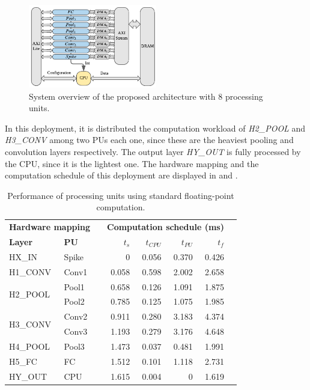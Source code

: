\begin{figure}[h!]
	\centering
	\includegraphics[width=0.5\textwidth]{../figures/sbs_hw_experimental.pdf}
	\caption{System overview of the proposed architecture with 8 processing units.}
	\label{fig:hw_sbs_8_pu}
\end{figure}

In this deployment, it is distributed the computation workload of \emph{H2\_POOL} and \emph{H3\_CONV} among two PUs each one, since these are the heaviest pooling and convolution layers respectively. The output layer \emph{HY\_OUT} is fully processed by the CPU, since it is the lightest one. The hardware mapping and the computation schedule of this deployment are displayed in  and .

\begin{table}[!ht]\centering
	\caption{Performance of processing units using standard floating-point computation.}\label{tab:latency_fp}
	\scriptsize
	\begin{tabular}{llrrrrrr}\toprule
		\multicolumn{2}{c}{\textbf{Hardware mapping}} & &\multicolumn{4}{c}{\textbf{Computation schedule (ms)}} \\\cmidrule{1-2}\cmidrule{4-7}
		\textbf{Layer} &\textbf{PU} & &$t_s$ &$t_{CPU}$ &$t_{PU}$ &$t_f$ \\\midrule
		HX\_IN &Spike & &0 &0.056 &0.370 &0.426 \\
		H1\_CONV &Conv1 & &0.058 &0.598 &2.002 &2.658 \\
		\multirow{2}{*}{H2\_POOL}
		&Pool1 & &0.658 &0.126 &1.091 &1.875 \\
		&Pool2 & &0.785 &0.125 &1.075 &1.985 \\
		\multirow{2}{*}{H3\_CONV} 
		&Conv2 & &0.911 &0.280 &3.183 &4.374 \\
		&Conv3 & &1.193 &0.279 &3.176 &4.648 \\
		H4\_POOL &Pool3 & &1.473 &0.037 &0.481 &1.991 \\
		H5\_FC &FC & &1.512 &0.101 &1.118 &2.731 \\
		HY\_OUT &CPU & &1.615 &0.004 &0 &1.619 \\
		\bottomrule
	\end{tabular}
\end{table}

